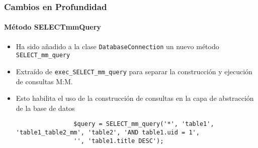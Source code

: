 \begin{frame}[fragile]
	\frametitle{Cambios en Profundidad}
	\framesubtitle{Método SELECTmmQuery}

	\lstset{basicstyle=\tiny\ttfamily}

	\begin{itemize}

		\item Ha sido añadido a la clase \texttt{DatabaseConnection} un nuevo método \texttt{SELECT\_mm\_query}

		\item Extraído de \texttt{exec\_SELECT\_mm\_query} para separar la construcción y ejecución
			de consultas M:M.

		\item Esto habilita el uso de la construcción de consultas en la capa de abstracción de la base de datos

			\begin{lstlisting}
				$query = SELECT_mm_query('*', 'table1', 'table1_table2_mm', 'table2', 'AND table1.uid = 1',
				'', 'table1.title DESC');
			\end{lstlisting}

	\end{itemize}

\end{frame}


